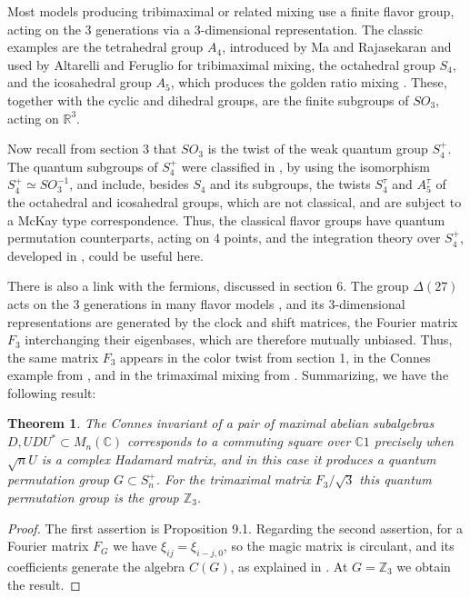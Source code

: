 \documentclass[11pt]{amsart}
\newtheorem{theorem}{Theorem}[section]
\theoremstyle{definition}
\begin{document}
Most models producing tribimaximal or related mixing use a finite flavor group, acting on the 3 generations via a 3-dimensional representation. The classic examples are the tetrahedral group $A_4$, introduced by Ma and Rajasekaran \cite{mra} and used by Altarelli and Feruglio \cite{afe} for tribimaximal mixing, the octahedral group $S_4$, and the icosahedral group $A_5$, which produces the golden ratio mixing \cite{est}. These, together with the cyclic and dihedral groups, are the finite subgroups of $SO_3$, acting on $\mathbb R^3$.

Now recall from section 3 that $SO_3$ is the twist of the weak quantum group $S_4^+$. The quantum subgroups of $S_4^+$ were classified in \cite{bbi}, by using the isomorphism $S_4^+\simeq SO_3^{-1}$, and include, besides $S_4$ and its subgroups, the twists $S_4^\tau$ and $A_5^\tau$ of the octahedral and icosahedral groups, which are not classical, and are subject to a McKay type correspondence. Thus, the classical flavor groups have quantum permutation counterparts, acting on 4 points, and the integration theory over $S_4^+$, developed in \cite{bcp}, could be useful here.

There is also a link with the fermions, discussed in section 6. The group $\Delta(27)$ acts on the 3 generations in many flavor models \cite{bgg,hls}, and its 3-dimensional representations are generated by the clock and shift matrices, the Fourier matrix $F_3$ interchanging their eigenbases, which are therefore mutually unbiased. Thus, the same matrix $F_3$ appears in the color twist from section 1, in the Connes example from \cite{co2}, and in the trimaximal mixing from \cite{cab,wol}. Summarizing, we have the following result:

\begin{theorem}
The Connes invariant of a pair of maximal abelian subalgebras $D,UDU^*\subset M_n(\mathbb C)$ corresponds to a commuting square over $\mathbb C1$ precisely when $\sqrt{n}U$ is a complex Hadamard matrix, and in this case it produces a quantum permutation group $G\subset S_n^+$. For the trimaximal matrix $F_3/\sqrt{3}$ this quantum permutation group is the group $\mathbb Z_3$.
\end{theorem}

\begin{proof}
The first assertion is Proposition 9.1. Regarding the second assertion, for a Fourier matrix $F_G$ we have $\xi_{ij}=\xi_{i-j,0}$, so the magic matrix is circulant, and its coefficients generate the algebra $C(G)$, as explained in \cite{bhm}. At $G=\mathbb Z_3$ we obtain the result.
\end{proof}
\end{document}
